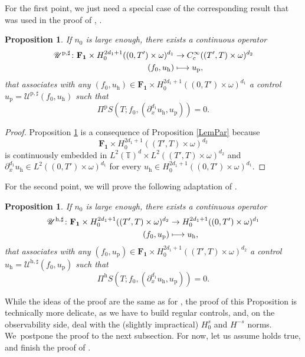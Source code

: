 \documentclass[10pt]{amsart}
\let\mathcal\mathscr
\def\mto{\mathchoice{\longmapsto}{\mapsto}{\mapsto}{\mapsto}}
\theoremstyle{plain}
\newtheorem{prop}[theorem]{Proposition}
\theoremstyle{definition}
\theoremstyle{remark}
\newcommand{\set}{\mathbb}
\newcommand{\T}{\set{T}}
\newcommand{\h}{{\mathrm h}}
\newcommand{\p}{{\mathrm p}}
\begin{document}
For the first point, we just need a special case of the corresponding result that was used in the proof of , \ie {}.
\begin{prop}
\label{LemPar_BIS1}
If $n_0$ is large enough, there exists a continuous operator
\begin{align*}
\mathcal U^{\p,\sharp} \colon \mathbf{F_1} \times H^{2d_1+1}_0((0,T')\times\omega)^{d_1} & \to C^\infty_c((T',T)\times\omega)^{d_2} \\
(f_0,u_{\h}) &\mto u_{\p},
\end{align*}
that associates with any $(f_0,u_{\h})\in \mathbf{F_1} \times H^{2d_1+1}_0((0,T')\times\omega)^{d_1} $ a control $u_{\p}=\mathcal U^{\p,\sharp}(f_0,u_{\h})$ such that
\begin{equation*}
\Pi^{\p} S(T;f_0, (\partial_x^{d_1} u_{\h},u_{\p})) = 0.
\end{equation*}
\end{prop}
\begin{proof}
Proposition \ref{LemPar_BIS1} is a consequence of Proposition \ref{LemPar} because
\[
\mathbf{F_1} \times H^{2d_1+1}_0((T',T)\times\omega)^{d_2}
\]
is continuously embedded in $L^2(\T)^d \times L^2((T',T)\times \omega)^{d_2}$ and $\partial_x^{d_1} u_{\h} \in L^2((0,T')\times\omega)^{d_1}$ for every $u_{\h} \in H^{2d_1+1}_0((0,T')\times\omega)^{d_1}$.
\end{proof}

For the second point, we will prove the following adaptation of .
\begin{prop}
\label{LemHyp_BIS1}
If $n_0$ is large enough, there exists a continuous operator
\begin{align*}
\mathcal U^{\h,\sharp} \colon
\mathbf{F_1} \times H_0^{2d_1+1}((T',T)\times\omega)^{d_2} & \to H^{2d_1+1}_0((0,T')\times\omega)^{d_1}\\
(f_0,u_{\p}) &\mto u_{\h},
\end{align*}
that associates with any $(f_0,u_{\p})\in \mathbf{F_1} \times H^{2d_1+1}_0((T',T)\times\omega)^{d_2} $ a control $u_{\h}=\mathcal U^{\h,\sharp}(f_0,u_{\p})$ such that
\begin{equation}\label{eq:LemHyp_BIS1}
\Pi^{\h} S(T;f_0, (\partial_x^{d_1} u_{\h},u_{\p})) = 0.
\end{equation}
\end{prop}
While the ideas of the proof are the same as for , the proof of this Proposition is technically more delicate, as we have to build regular controls, and, on the observability side, deal with the (slightly impractical) $H^s_0$ and $H^{-s}$ norms. We~postpone the proof to the next subsection. For now, let us assume  holds true, and finish the proof of .
\end{document}
